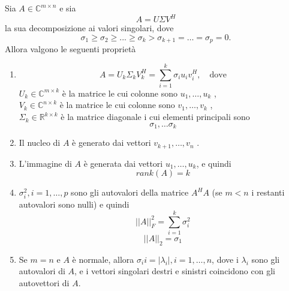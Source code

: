 \begin{theo}
\label{eq:06minq33}
 Sia $A \in \mathbb{C}^{m \times n}$ e sia
$$A = U\Sigma V^{H}$$
la sua decomposizione ai valori singolari, dove
$$\sigma_1 \geq \sigma_2 \geq . . .
 \geq \sigma_k > \sigma_{k+1} = \ldots = \sigma_p = 0.
$$
Allora valgono le seguenti propriet\`a
\begin{enumerate}
\item
$$ A = U_k \Sigma_k V_k^{H}
= \displaystyle \sum_{i=1}^{k} \sigma_i u_i v_i^{H} , \quad \text{
dove}
$$
$U_k \in \mathbb{C}^{m\times k}$ \`e la matrice le cui colonne sono
$u_1 , \ldots , u_k$ , \\ $V_k \in \mathbb{C}^{n×k}$ \`e la matrice le
cui colonne sono $v_1 , \ldots, v_k$ , \\ $\Sigma_k \in
\mathbb{R}^{k\times k}$ \`e la matrice diagonale i cui elementi
principali sono
$$ \sigma_1, \ldots \sigma_k$$

\item Il nucleo di $A$ \`e generato dai vettori $v_{k+1} ,\ldots ,
v_n$ .

\item L'immagine di $A$ \`e generata dai vettori $u_1, \ldots , u_k$,
e quindi
$$rank(A) = k$$
\item

 $\sigma_i^{2} , i = 1, \ldots, p$ sono gli autovalori della matrice
$A^H A$ (se $m < n$ i restanti autovalori sono nulli) e quindi
$$
||A||_{F}^{2} = \displaystyle \sum_{i=1}^{k} \sigma_i^{2}
$$
$$||A||_2 = \sigma_1 $$

\item Se $m = n$ e $A$ \`e normale, allora $\sigma_ii = |\lambda_i |,
i = 1, \ldots , n$, dove i $\lambda_i$ sono gli autovalori di $A$, e i
vettori singolari destri e sinistri coincidono con gli autovettori di
$A$.
\end{enumerate}

\end{theo}


